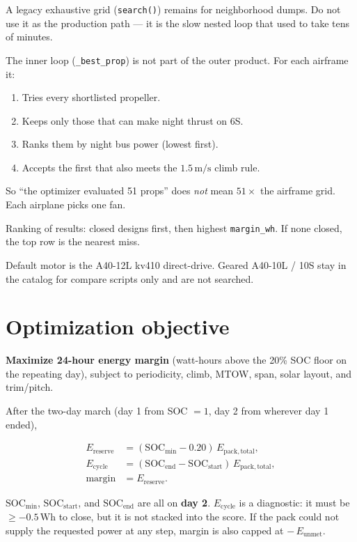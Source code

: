 \documentclass[11pt,letterpaper]{article}
\newcommand{\code}[1]{\texttt{#1}}
\begin{document}
A legacy exhaustive grid (\code{search()}) remains for neighborhood dumps. Do not use it as the production path --- it is the slow nested loop that used to take tens of minutes.

The inner loop (\code{\_best\_prop}) is not part of the outer product. For each airframe it:

\begin{enumerate}
  \item Tries every shortlisted propeller.
  \item Keeps only those that can make night thrust on 6S.
  \item Ranks them by night bus power (lowest first).
  \item Accepts the first that also meets the $1.5\,\mathrm{m/s}$ climb rule.
\end{enumerate}

So ``the optimizer evaluated 51 props'' does \emph{not} mean $51\times$ the airframe grid. Each airplane picks one fan.

Ranking of results: closed designs first, then highest \code{margin\_wh}. If none closed, the top row is the nearest miss.

Default motor is the A40-12L kv410 direct-drive. Geared A40-10L / 10S stay in the catalog for compare scripts only and are not searched.

\section{Optimization objective}

\textbf{Maximize 24-hour energy margin} (watt-hours above the 20\% SOC floor on the repeating day), subject to periodicity, climb, MTOW, span, solar layout, and trim/pitch.

After the two-day march (day 1 from SOC $=1$, day 2 from wherever day 1 ended),

\begin{align}
  E_\mathrm{reserve}
    &= (\mathrm{SOC}_\mathrm{min} - 0.20)\,E_\mathrm{pack,total}, \\
  E_\mathrm{cycle}
    &= (\mathrm{SOC}_\mathrm{end} - \mathrm{SOC}_\mathrm{start})\,E_\mathrm{pack,total}, \\
  \mathrm{margin}
    &= E_\mathrm{reserve}.
\end{align}

$\mathrm{SOC}_\mathrm{min}$, $\mathrm{SOC}_\mathrm{start}$, and $\mathrm{SOC}_\mathrm{end}$ are all on \textbf{day 2}. $E_\mathrm{cycle}$ is a diagnostic: it must be $\ge -0.5\,\mathrm{Wh}$ to close, but it is not stacked into the score. If the pack could not supply the requested power at any step, margin is also capped at $-\,E_\mathrm{unmet}$.
\end{document}
